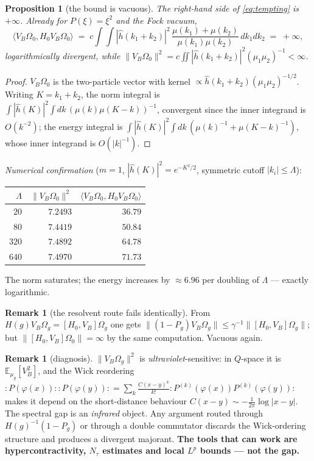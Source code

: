 \documentclass[11pt,a4paper]{article}
\theoremstyle{plain}
\newtheorem{proposition}[theorem]{Proposition}
\theoremstyle{definition}
\newtheorem{remark}[theorem]{Remark}
\newcommand{\Om}{\Omega}
\newcommand{\ip}[2]{\langle #1,#2\rangle}
\begin{document}
\begin{proposition}[the bound is vacuous]\label{prop:vacuous}
The right-hand side of \eqref{eq:tempting} is $+\infty$. Already for $P(\xi)=\xi^2$ and the Fock
vacuum,
\[
  \ip{V_B\Om_0}{H_0V_B\Om_0}\;=\;c\!\int\!\!\int
  |\hat h(k_1+k_2)|^2\,\frac{\mu(k_1)+\mu(k_2)}{\mu(k_1)\mu(k_2)}\,dk_1dk_2\;=\;+\infty ,
\]
logarithmically divergent, while $\|V_B\Om_0\|^2=c\iint|\hat h(k_1+k_2)|^2(\mu_1\mu_2)^{-1}<\infty$.
\end{proposition}

\begin{proof}
$V_B\Om_0$ is the two-particle vector with kernel $\propto\hat h(k_1+k_2)(\mu_1\mu_2)^{-1/2}$.
Writing $K=k_1+k_2$, the norm integral is $\int|\hat h(K)|^2\!\int dk\,(\mu(k)\mu(K-k))^{-1}$,
convergent since the inner integrand is $O(k^{-2})$; the energy integral is
$\int|\hat h(K)|^2\!\int dk\,(\mu(k)^{-1}+\mu(K-k)^{-1})$, whose inner integrand is $O(|k|^{-1})$.
\end{proof}

\emph{Numerical confirmation} ($m=1$, $|\hat h(K)|^2=e^{-K^2/2}$, symmetric cutoff $|k_i|\le\Lambda$):

\begin{center}
\begin{tabular}{rrr}
\toprule
$\Lambda$ & $\|V_B\Om_0\|^2$ & $\ip{V_B\Om_0}{H_0V_B\Om_0}$\\
\midrule
$20$  & $7.2493$ & $36.79$\\
$80$  & $7.4419$ & $50.84$\\
$320$ & $7.4892$ & $64.78$\\
$640$ & $7.4970$ & $71.73$\\
\bottomrule
\end{tabular}
\end{center}
The norm saturates; the energy increases by $\approx6.96$ per doubling of $\Lambda$ --- exactly
logarithmic.

\begin{remark}[the resolvent route fails identically]
From $H(g)V_B\Om_g=[H_0,V_B]\Om_g$ one gets
$\|(1-P_g)V_B\Om_g\|\le\gamma^{-1}\|[H_0,V_B]\Om_g\|$; but $\|[H_0,V_B]\Om_0\|=\infty$ by the same
computation. Vacuous again.
\end{remark}

\begin{remark}[diagnosis]\label{rem:diag}
$\|V_B\Om_g\|^2$ is \emph{ultraviolet}-sensitive: in $Q$-space it is
$\mathbb E_{\mu_g}[V_B^2]$, and the Wick reordering
${:}P(\varphi(x)){:}{:}P(\varphi(y)){:}=\sum_k\frac{C(x-y)^k}{k!}
{:}P^{(k)}(\varphi(x))P^{(k)}(\varphi(y)){:}$ makes it depend on the short-distance behaviour
$C(x-y)\sim-\tfrac1{2\pi}\log|x-y|$. The spectral gap is an \emph{infrared} object. Any argument
routed through $H(g)^{-1}(1-P_g)$ or through a double commutator discards the Wick-ordering
structure and produces a divergent majorant. \textbf{The tools that can work are
hypercontractivity, $N_\tau$ estimates and local $L^p$ bounds --- not the gap.}
\end{remark}
\end{document}

